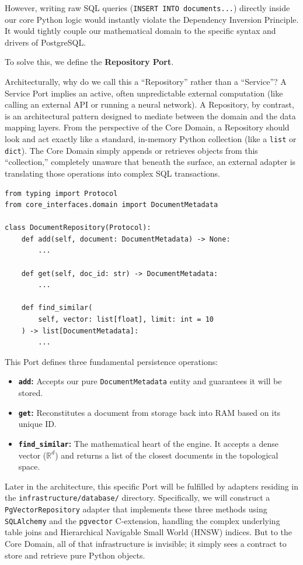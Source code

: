 However, writing raw SQL queries (\texttt{INSERT INTO documents...}) directly inside our core Python logic would instantly violate the Dependency Inversion Principle. It would tightly couple our mathematical domain to the specific syntax and drivers of PostgreSQL.

To solve this, we define the \textbf{Repository Port}.

Architecturally, why do we call this a ``Repository'' rather than a ``Service''? A Service Port implies an active, often unpredictable external computation (like calling an external API or running a neural network). A Repository, by contrast, is an architectural pattern designed to mediate between the domain and the data mapping layers. From the perspective of the Core Domain, a Repository should look and act exactly like a standard, in-memory Python collection (like a \texttt{list} or \texttt{dict}). The Core Domain simply appends or retrieves objects from this ``collection,'' completely unaware that beneath the surface, an external adapter is translating those operations into complex SQL transactions.

\begin{lstlisting}[caption={The Repository Protocol}]
from typing import Protocol
from core_interfaces.domain import DocumentMetadata

class DocumentRepository(Protocol):
    def add(self, document: DocumentMetadata) -> None:
        ...

    def get(self, doc_id: str) -> DocumentMetadata:
        ...

    def find_similar(
        self, vector: list[float], limit: int = 10
    ) -> list[DocumentMetadata]:
        ...
\end{lstlisting}

This Port defines three fundamental persistence operations:
\begin{itemize}
    \item \textbf{\texttt{add}:} Accepts our pure \texttt{DocumentMetadata} entity and guarantees it will be stored.
    \item \textbf{\texttt{get}:} Reconstitutes a document from storage back into RAM based on its unique ID.
    \item \textbf{\texttt{find\_similar}:} The mathematical heart of the engine. It accepts a dense vector ($\mathbb{R}^d$) and returns a list of the closest documents in the topological space.
\end{itemize}

Later in the architecture, this specific Port will be fulfilled by adapters residing in the \texttt{infrastructure/\allowbreak{}database/} directory. Specifically, we will construct a \texttt{PgVectorRepository} adapter that implements these three methods using \texttt{SQLAlchemy} and the \texttt{pgvector} C-extension, handling the complex underlying table joins and Hierarchical Navigable Small World (HNSW) indices. But to the Core Domain, all of that infrastructure is invisible; it simply sees a contract to store and retrieve pure Python objects.






